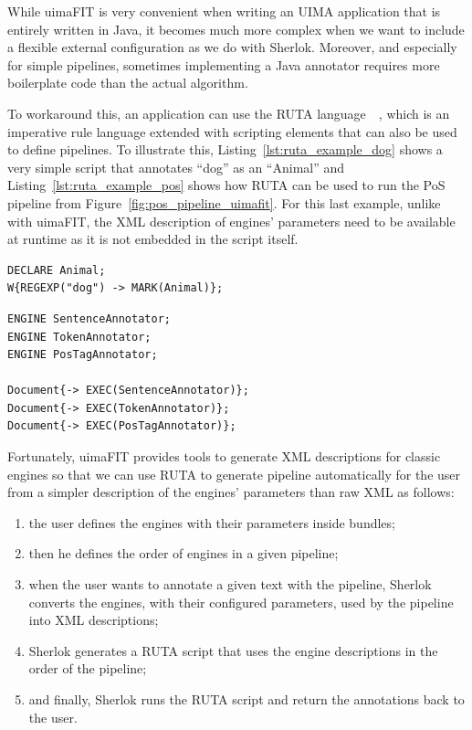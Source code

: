 \documentclass{article}
\newcommand{\ID}[1]{{\textsc{#1}}}
\begin{document}

While uimaFIT is very convenient when writing an UIMA application that is entirely written in Java,
it becomes much more complex when we want to include a flexible external configuration as we do with
Sherlok. Moreover, and especially for simple pipelines, sometimes implementing a Java annotator
requires more boilerplate code than the actual algorithm.

To workaround this, an application can use the RUTA language~\cite{ruta}~\cite{ruta_2014}, which is
an imperative rule language extended with scripting elements that can also be used to define
pipelines. To illustrate this, Listing~\ref{lst:ruta_example_dog} shows a very simple script that
annotates ``dog'' as an ``Animal'' and Listing~\ref{lst:ruta_example_pos} shows how RUTA can be used
to run the PoS pipeline from Figure~\ref{fig:pos_pipeline_uimafit}. For this last example, unlike
with uimaFIT, the XML description of engines' parameters need to be available at runtime as it is
not embedded in the script itself.

\begin{lstlisting}[float,language=ruta,
                   caption=A basic RUTA script,
                   label=lst:ruta_example_dog]
DECLARE Animal;
W{REGEXP("dog") -> MARK(Animal)};
\end{lstlisting}

\begin{lstlisting}[float,language=ruta,
                   caption=PoS pipeline written in RUTA,
                   label=lst:ruta_example_pos]
ENGINE SentenceAnnotator;
ENGINE TokenAnnotator;
ENGINE PosTagAnnotator;

Document{-> EXEC(SentenceAnnotator)};
Document{-> EXEC(TokenAnnotator)};
Document{-> EXEC(PosTagAnnotator)};
\end{lstlisting}

Fortunately, uimaFIT provides tools to generate XML descriptions for classic engines so that we can
use RUTA to generate pipeline automatically for the user from a simpler description of the engines'
parameters than raw XML as follows:

\begin{enumerate}
    \item the user defines the engines with their parameters inside bundles;
    \item then he defines the order of engines in a given pipeline;
    \item when the user wants to annotate a given text with the pipeline, Sherlok converts the
        engines, with their configured parameters, used by the pipeline into XML descriptions;
    \item Sherlok generates a RUTA script that uses the engine descriptions in the order of the
        pipeline;
    \item and finally, Sherlok runs the RUTA script and return the annotations back to the user.
\end{enumerate}
\end{document}
